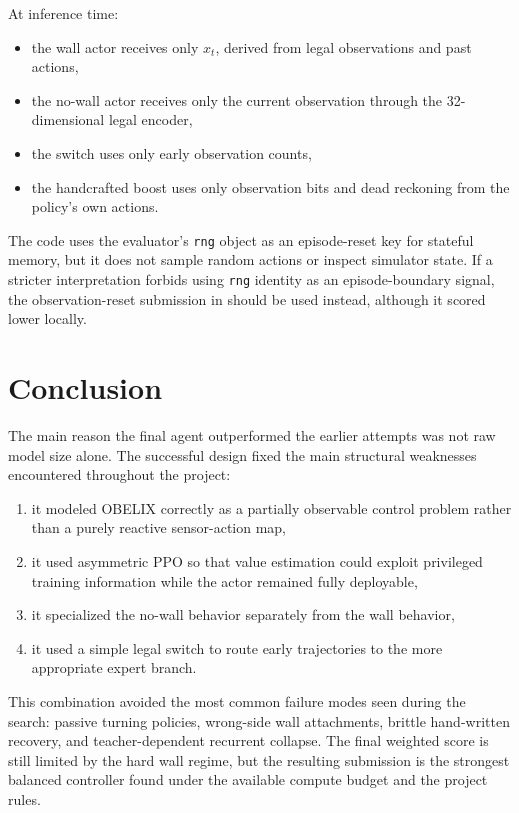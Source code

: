 \documentclass[11pt]{article}
\begin{document}
At inference time:
\begin{itemize}[leftmargin=1.5em]
  \item the wall actor receives only \(x_t\), derived from legal observations and past
  actions,
  \item the no-wall actor receives only the current observation through the 32-dimensional
  legal encoder,
  \item the switch uses only early observation counts,
  \item the handcrafted boost uses only observation bits and dead reckoning from the
  policy's own actions.
\end{itemize}
The code uses the evaluator's \texttt{rng} object as an episode-reset key for stateful
memory, but it does not sample random actions or inspect simulator state. If a stricter
interpretation forbids using \texttt{rng} identity as an episode-boundary signal, the
observation-reset submission in  should be used instead, although it
scored lower locally.

\section{Conclusion}

The main reason the final agent outperformed the earlier attempts was not raw model
size alone. The successful design fixed the main structural weaknesses encountered
throughout the project:
\begin{enumerate}[leftmargin=1.5em]
  \item it modeled OBELIX correctly as a partially observable control problem rather
  than a purely reactive sensor-action map,
  \item it used asymmetric PPO so that value estimation could exploit privileged training
  information while the actor remained fully deployable,
  \item it specialized the no-wall behavior separately from the wall behavior,
  \item it used a simple legal switch to route early trajectories to the more appropriate
  expert branch.
\end{enumerate}

This combination avoided the most common failure modes seen during the search:
passive turning policies, wrong-side wall attachments, brittle hand-written recovery, and
teacher-dependent recurrent collapse. The final weighted score is still limited by the
hard wall regime, but the resulting submission is the strongest balanced controller found
under the available compute budget and the project rules.
\end{document}
